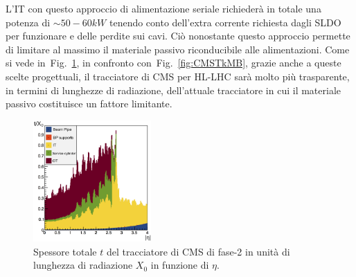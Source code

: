 L'IT con questo approccio di alimentazione seriale richieder\`a in totale una potenza di $\sim 50-60kW$ tenendo conto dell'extra corrente richiesta dagli SLDO per funzionare e delle perdite sui cavi. Ci\`o nonostante questo approccio permette di limitare al massimo il materiale passivo riconducibile alle alimentazioni. Come si vede in~Fig.~\ref{fig:MBfase2}, in confronto con~Fig.~\ref{fig:CMSTkMB}, grazie anche a queste scelte progettuali, il tracciatore di CMS per HL-LHC sar\`a molto pi\`u trasparente, in termini di lunghezze di radiazione, dell'attuale tracciatore in cui il materiale passivo costituisce un fattore limitante.
\begin{figure}
\centering
\includegraphics[width=0.4\textwidth]{Immagini/MBfase2.png}
\caption{Spessore totale $t$ del tracciatore di CMS di fase-2 in unit\`a di lunghezza di radiazione $X_0$ in funzione di $\eta$.}
\label{fig:MBfase2}
\end{figure}

